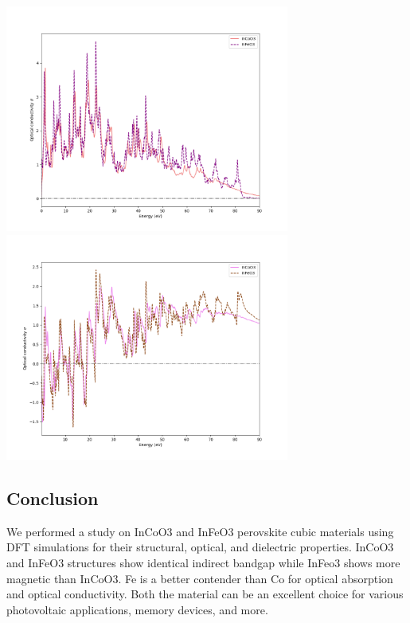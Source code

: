 \documentclass[12pt, letterpaper]{article}
\newcommand*{\1}{\hspace{1pt}}
\begin{document}
    \begin{adjustbox}{center,caption={Optical Conductivity of InCoO3 and InFeO3},label={somelabel},nofloat=figure,}
        \includegraphics[width=0.7\textwidth]{opcondrealev}
        \includegraphics[width=0.7\textwidth]{opcondimagev}
    \end{adjustbox}

    \subsection*{Conclusion}
    We performed a study on  InCoO3 and InFeO3 perovskite cubic materials using  DFT simulations for their structural, optical, and dielectric properties. InCoO3
    and InFeO3 structures show identical indirect bandgap while InFeo3 shows more magnetic than InCoO3. Fe is a better contender than Co for optical absorption 
    and optical conductivity. Both the material can be an excellent choice for various photovoltaic applications, memory devices, and more.

    
\end{document}

